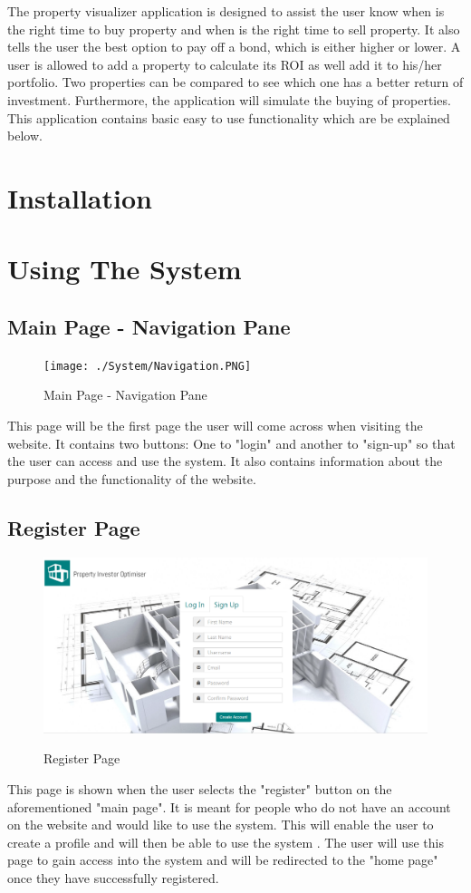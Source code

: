\documentclass[a4paper,12pt]{article}
\begin{document}
The property visualizer application is designed to assist the user know when is the right time to buy property and when is the right time to sell property. It also tells the user the best option to pay off a bond, which is either higher or lower. A user is allowed to add a property to calculate its ROI as well add it to his/her portfolio. Two properties can be compared to see which one has a better return of investment. Furthermore, the application will simulate the buying of properties. This application contains basic easy to use functionality which are be explained below.
\section{Installation}


\section{Using The System}

 
\subsection{Main Page - Navigation Pane}
	\begin{figure}[H]
		\texttt{[image: ./System/Navigation.PNG]}\\[0.4cm]  
		\caption{Main Page - Navigation Pane}
	\end{figure}
This page will be the first page the user will come across when visiting the website. It contains two buttons: One to "login" and another to "sign-up" so that the user can access and use the system. It also contains information about the purpose and the functionality of the website.

\subsection{Register Page}
	\begin{figure}[H]
		\includegraphics[width=0.9\linewidth, center]{./System/Register.PNG}\\[0.4cm]  
		\caption{Register Page}
	\end{figure}
This page is shown when the user selects the "register" button on the aforementioned "main page". It is meant for people who do not have an account on the website and would like to use the system. This will enable the user to create a profile and will then be able to use the system . The user will use this page to gain access into the system and will be redirected to the "home page" once they have successfully registered.
\end{document}
